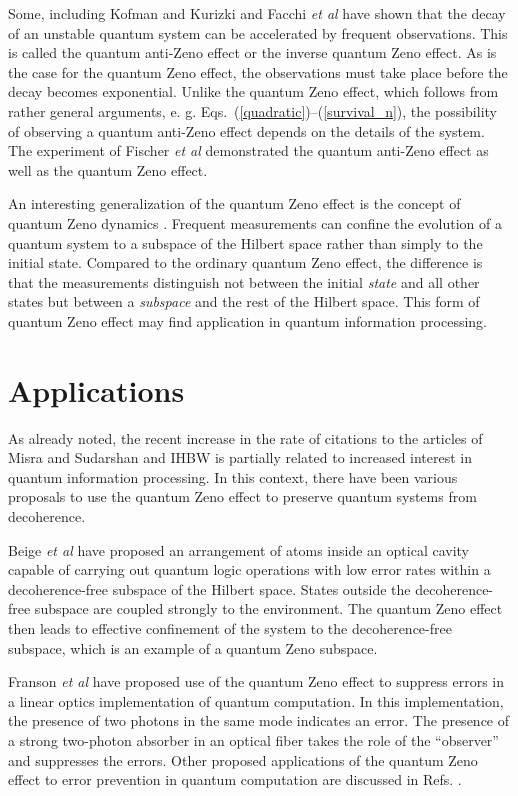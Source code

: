 \documentclass[letterpaper]{jpconf}
\begin{document}
Some, including Kofman and Kurizki \cite{kofman00} and Facchi {\em
et al} \cite{facchi01} have shown that the decay of an unstable
quantum system can be accelerated by frequent observations.  This is
called the quantum anti-Zeno effect or the inverse quantum Zeno
effect.  As is the case for the quantum Zeno effect, the
observations must take place before the decay becomes exponential.
Unlike the quantum Zeno effect, which follows from rather general
arguments, e. g. Eqs.~(\ref{quadratic})--(\ref{survival_n}), the
possibility of observing a quantum anti-Zeno effect depends on the
details of the system. The experiment of Fischer {\em et al}
\cite{fischer01} demonstrated the quantum anti-Zeno effect as well
as the quantum Zeno effect. 

An interesting generalization of the quantum Zeno effect is the
concept of quantum Zeno dynamics \cite{facchi00,facchi02}.  Frequent
measurements can confine the evolution of a quantum system to a
subspace of the Hilbert space rather than simply to the initial
state.  Compared to the ordinary quantum Zeno effect, the difference
is that the measurements distinguish not between the initial {\em
state} and all other states but between a {\em subspace} and the
rest of the Hilbert space. This form of quantum Zeno effect may find
application in quantum information processing.


\section{Applications}

As already noted, the recent increase in the rate of citations to
the articles of Misra and Sudarshan \cite{misra77} and IHBW
\cite{itano90} is partially related to increased interest in quantum
information processing.  In this context, there have been various
proposals to use the quantum Zeno effect to preserve quantum systems
from decoherence.

Beige {\em et al} \cite{beige00} have proposed an arrangement of
atoms inside an optical cavity capable of carrying out quantum logic
operations with low error rates within a decoherence-free subspace
of the Hilbert space. States outside the decoherence-free subspace
are coupled strongly to the environment. The quantum Zeno effect
then leads to effective confinement of the system to the
decoherence-free subspace, which is an example of a quantum Zeno
subspace.

Franson {\em et al} \cite{franson04} have proposed use of the
quantum Zeno effect to suppress errors in a linear optics
implementation of quantum computation. In this implementation, the
presence of two photons in the same mode indicates an error. The
presence of a strong two-photon absorber in an optical fiber takes
the role of the ``observer'' and suppresses the errors. Other
proposed applications of the quantum Zeno effect to error prevention
in quantum computation are discussed in Refs.
\cite{zurek84,vaidman96,pachos02,ralph03}.
\end{document}
